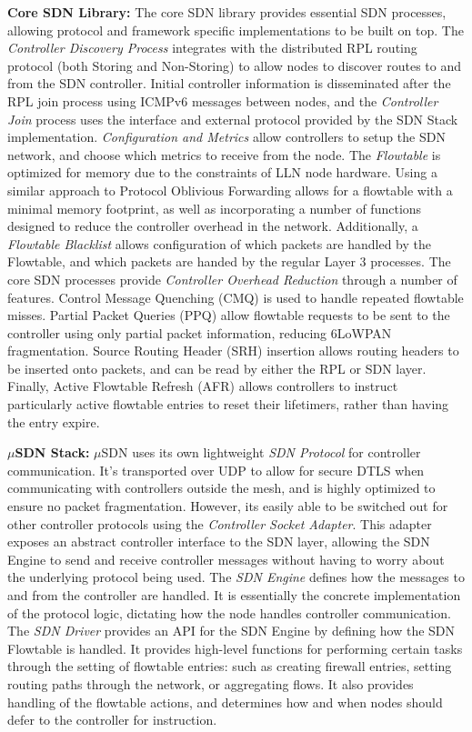 \textbf{Core SDN Library:} The core SDN library provides essential SDN processes, allowing protocol and framework specific implementations to be built on top. The \textit{Controller Discovery Process} integrates with the distributed RPL routing protocol (both Storing and Non-Storing) to allow nodes to discover routes to and from the SDN controller. Initial controller information is disseminated after the RPL join process using ICMPv6 messages between nodes, and the \textit{Controller Join} process uses the interface and external protocol provided by the SDN Stack implementation. \textit{Configuration and Metrics} allow controllers to setup the SDN network, and choose which metrics to receive from the node. The \textit{Flowtable} is optimized for memory due to the constraints of LLN node hardware. Using a similar approach to Protocol Oblivious Forwarding allows for a flowtable with a minimal memory footprint, as well as incorporating a number of functions designed to reduce the controller overhead in the network. Additionally, a \textit{Flowtable Blacklist} allows configuration of which packets are handled by the Flowtable, and which packets are handed by the regular Layer 3 processes. The core SDN processes provide \textit{Controller Overhead Reduction} through a number of features. Control Message Quenching (CMQ) \cite{cmq} is used to handle repeated flowtable misses. Partial Packet Queries (PPQ) allow flowtable requests to be sent to the controller using only partial packet information, reducing 6LoWPAN fragmentation. Source Routing Header (SRH) insertion allows routing headers to be inserted onto packets, and can be read by either the RPL or SDN layer. Finally, Active Flowtable Refresh (AFR) allows controllers to instruct particularly active flowtable entries to reset their lifetimers, rather than having the entry expire.  

\textbf{$\mu$SDN Stack:} $\mu$SDN uses its own lightweight \textit{SDN Protocol} for controller communication. It's transported over UDP to allow for secure DTLS when communicating with controllers outside the mesh, and is highly optimized to ensure no packet fragmentation. However, its easily able to be switched out for other controller protocols using the \textit{Controller Socket Adapter}. This adapter exposes an abstract controller interface to the SDN layer, allowing the SDN Engine to send and receive controller messages without having to worry about the underlying protocol being used. The \textit{SDN Engine} defines how the messages to and from the controller are handled. It is essentially the concrete implementation of the protocol logic, dictating how the node handles controller communication. The \textit{SDN Driver} provides an API for the SDN Engine by defining how the SDN Flowtable is handled. It provides high-level functions for performing certain tasks through the setting of flowtable entries: such as creating firewall entries, setting routing paths through the network, or aggregating flows. It also provides handling of the flowtable actions, and determines how and when nodes should defer to the controller for instruction.

